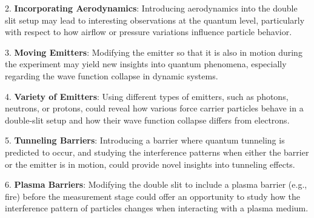\documentclass{article}
\begin{document}
2. \textbf{Incorporating Aerodynamics}: Introducing aerodynamics into the double slit setup may lead to interesting observations at the quantum level, particularly with respect to how airflow or pressure variations influence particle behavior.

3. \textbf{Moving Emitters}: Modifying the emitter so that it is also in motion during the experiment may yield new insights into quantum phenomena, especially regarding the wave function collapse in dynamic systems.

4. \textbf{Variety of Emitters}: Using different types of emitters, such as photons, neutrons, or protons, could reveal how various force carrier particles behave in a double-slit setup and how their wave function collapse differs from electrons.

5. \textbf{Tunneling Barriers}: Introducing a barrier where quantum tunneling is predicted to occur, and studying the interference patterns when either the barrier or the emitter is in motion, could provide novel insights into tunneling effects.

6. \textbf{Plasma Barriers}: Modifying the double slit to include a plasma barrier (e.g., fire) before the measurement stage could offer an opportunity to study how the interference pattern of particles changes when interacting with a plasma medium.



\end{document}
